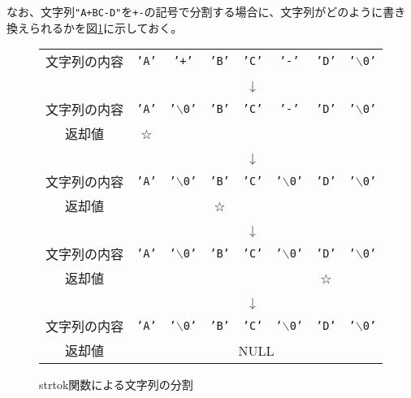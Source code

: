 なお、文字列\verb|"A+BC-D"|を\verb|+-|の記号で分割する場合に、文字列がどのように書き換えられるかを図\ref{strtok_fig}に示しておく。

\begin{figure}[H]
{\small
\begin{center}
 \begin{tabular}{cccccccc} \cline{2-8}
  文字列の内容 & \multicolumn{1}{|c}{\tt 'A'} & {\tt '+'} & {\tt 'B'} & {\tt 'C'} & {\tt '-'} & {\tt 'D'} & \multicolumn{1}{c|}{\tt '$\backslash$0'} \\ \cline{2-8}
 & & & & ↓ & & & \\ \cline{2-8}
  文字列の内容 & \multicolumn{1}{|c}{\tt 'A'} & {\tt '$\backslash$0'} & {\tt 'B'} & {\tt 'C'} & {\tt '-'} & {\tt 'D'} & \multicolumn{1}{c|}{\tt '$\backslash$0'} \\ \cline{2-8}
  返却値 & ☆ & & & & & & \\
 & & & & ↓ & & & \\ \cline{2-8}
  文字列の内容 & \multicolumn{1}{|c}{\tt 'A'} & {\tt '$\backslash$0'} & {\tt 'B'} & {\tt 'C'} & {\tt '$\backslash$0'} & {\tt 'D'} & \multicolumn{1}{c|}{\tt '$\backslash$0'} \\ \cline{2-8}
  返却値 & & & ☆ & & & & \\
 & & & & ↓ & & & \\ \cline{2-8}
  文字列の内容 & \multicolumn{1}{|c}{\tt 'A'} & {\tt '$\backslash$0'} & {\tt 'B'} & {\tt 'C'} & {\tt '$\backslash$0'} & {\tt 'D'} & \multicolumn{1}{c|}{\tt '$\backslash$0'} \\ \cline{2-8}
  返却値 & & & & & & ☆ & \\
 & & & & ↓ & & & \\ \cline{2-8}
  文字列の内容 & \multicolumn{1}{|c}{\tt 'A'} & {\tt '$\backslash$0'} & {\tt 'B'} & {\tt 'C'} & {\tt '$\backslash$0'} & {\tt 'D'} & \multicolumn{1}{c|}{\tt '$\backslash$0'} \\ \cline{2-8}
  返却値 & \multicolumn{7}{c}{NULL} \\
 \end{tabular}
\end{center}
}
\caption{strtok関数による文字列の分割}
\label{strtok_fig}
\end{figure}

